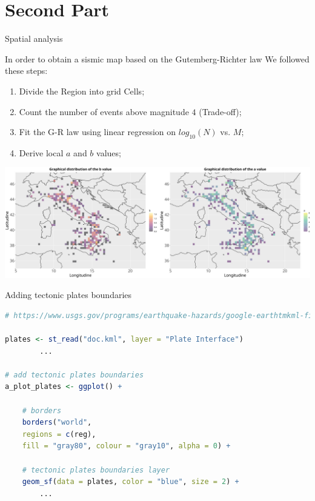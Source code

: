 \documentclass[aspectratio=43]{beamer}
\begin{document}
\section{Second Part}

\begin{frame}{Spatial analysis}

In order to obtain a sismic map based on the Gutemberg-Richter law We followed these steps:\pause

\begin{enumerate}
	\item Divide the Region into grid Cells; \pause
	\item Count the number of events above magnitude $4$ (Trade-off); \pause
	\item Fit the G-R law using linear regression on $log_{10}(N)$ vs. $M$; \pause
	\item Derive local $a$ and $b$ values; \pause
	
\end{enumerate}

\centering
\includegraphics[width=1\textwidth]{EQ_images/G_R_parameters.png} \\

\end{frame}

	
\begin{frame}[fragile]{Adding tectonic plates boundaries}
	\begin{lstlisting}[language=R, basicstyle=\ttfamily\scriptsize]
# https://www.usgs.gov/programs/earthquake-hazards/google-earthtmkml-files -> page where you can find the file for the edge of the plates
		
plates <- st_read("doc.kml", layer = "Plate Interface")
		...
		
# add tectonic plates boundaries
a_plot_plates <- ggplot() +

	# borders
	borders("world", 
	regions = c(reg), 
	fill = "gray80", colour = "gray10", alpha = 0) +
			
	# tectonic plates boundaries layer
	geom_sf(data = plates, color = "blue", size = 2) +
		...
	\end{lstlisting}
\end{frame}
	
\end{document}
